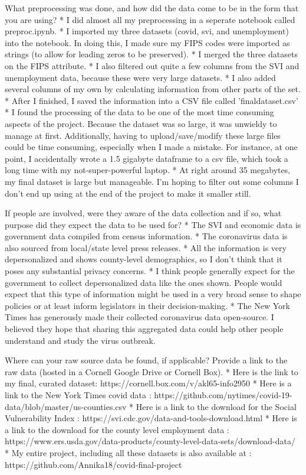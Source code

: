 \documentclass[11pt]{article}
\begin{document}
What preprocessing was done, and how did the data come to be in the form
that you are using? * I did almost all my preprocessing in a seperate
notebook called preproc.ipynb. * I imported my three datasets (covid,
svi, and unemployment) into the notebook. In doing this, I made sure my
FIPS codes were imported as strings (to allow for leading zeros to be
preserved). * I merged the three datasets on the FIPS attribute. * I
also filtered out quite a few columns from the SVI and unemployment
data, because these were very large datasets. * I also added several
columns of my own by calculating information from other parts of the
set. * After I finished, I saved the information into a CSV file called
'finaldataset.csv' * I found the processing of the data to be one of the
most time consuming aspects of the project. Because the dataset was so
large, it was unwieldy to manage at first. Additionally, having to
upload/save/modify these large files could be time consuming, especially
when I made a mistake. For instance, at one point, I accidentally wrote
a 1.5 gigabyte dataframe to a csv file, which took a long time with my
not-super-powerful laptop. * At right around 35 megabytes, my final
dataset is large but manageable. I'm hoping to filter out some columns I
don't end up using at the end of the project to make it smaller still.

If people are involved, were they aware of the data collection and if
so, what purpose did they expect the data to be used for? * The SVI and
economic data is government data compiled from census information. * The
coronavirus data is also sourced from local/state level press releases.
* All the information is very depersonalized and shows county-level
demographics, so I don't think that it poses any substantial privacy
concerns. * I think people generally expect for the government to
collect depersonalized data like the ones shown. People would expect
that this type of information might be used in a very broad sense to
shape policies or at least inform legislators in their decision-making.
* The New York Times has generously made their collected coronavirus
data open-source. I believed they hope that sharing this aggregated data
could help other people understand and study the virus outbreak.

Where can your raw source data be found, if applicable? Provide a link
to the raw data (hosted in a Cornell Google Drive or Cornell Box). *
Here is the link to my final, curated dataset:
https://cornell.box.com/v/akl65-info2950 * Here is a link to the New
York Times covid data :
https://github.com/nytimes/covid-19-data/blob/master/us-counties.csv *
Here is a link to the download for the Social Vulnerability Index :
https://svi.cdc.gov/data-and-tools-download.html * Here is a link to the
download for the county level employment data :
https://www.ers.usda.gov/data-products/county-level-data-sets/download-data/
* My entire project, including all these datasets is also available at :
https://github.com/Annika18/covid-final-project
\end{document}
